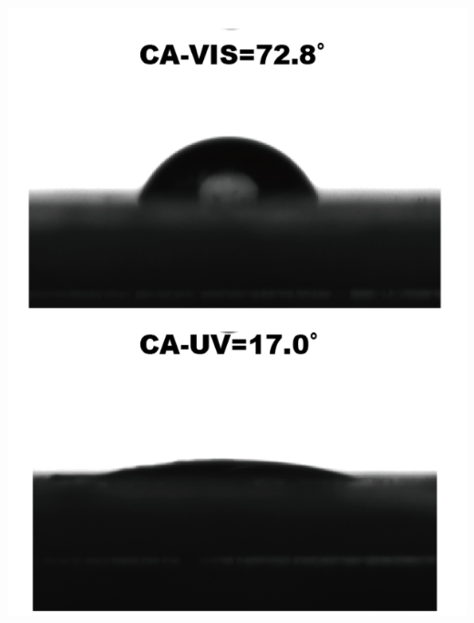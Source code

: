 \documentclass{beamer}
\begin{document}
\begin{frame}
\begin{minipage}{0.48\textwidth}
    \includegraphics[width=0.9\linewidth]{figures/CA-UV.png}
  \end{minipage}
\end{frame}
\end{document}
